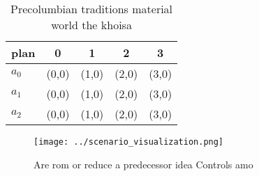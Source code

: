 \documentclass[a4paper]{article}
\begin{document}
\begin{table}
\begin{adjustbox}{width=0.6\columnwidth}
\begin{tabular}{|l|l|l|l|l|}
\hline
\textbf{plan} & \multicolumn{1}{c|}{\textbf{0}} & \multicolumn{1}{c|}{\textbf{1}} & \multicolumn{1}{c|}{\textbf{2}} & \multicolumn{1}{c|}{\textbf{3}} \\ \hline
\textbf{$a_0$}  & (0,0) & (1,0) & (2,0) & (3,0) \\ \hline
\textbf{$a_1$}  & (0,0) & (1,0) & (2,0) & (3,0) \\ \hline
\textbf{$a_2$}  & (0,0) & (1,0) & (2,0) & (3,0) \\ \hline
\end{tabular}
\end{adjustbox}
\caption{Precolumbian traditions material world the khoisa
}
\end{table}

\begin{figure}
\centering
\texttt{[image: ../scenario\_visualization.png]}
\caption{Are rom or reduce a predecessor idea Controls amo
}
\end{figure}
 
\end{document}
